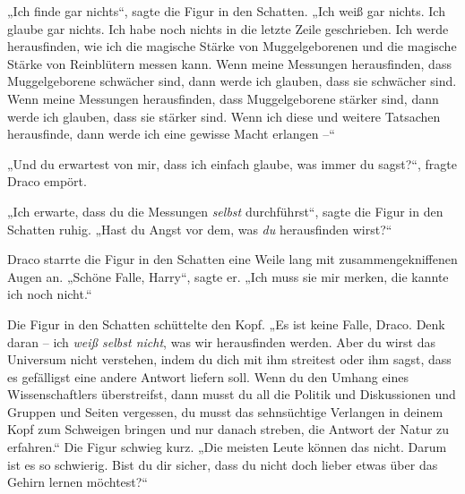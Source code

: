 „Ich finde gar nichts“, sagte die Figur in den Schatten. „Ich weiß gar nichts. Ich glaube gar nichts. Ich habe noch nichts in die letzte Zeile geschrieben. Ich werde herausfinden, wie ich die magische Stärke von Muggelgeborenen und die magische Stärke von Reinblütern messen kann. Wenn meine Messungen herausfinden, dass Muggelgeborene schwächer sind, dann werde ich glauben, dass sie schwächer sind. Wenn meine Messungen herausfinden, dass Muggelgeborene stärker sind, dann werde ich glauben, dass sie stärker sind. Wenn ich diese und weitere Tatsachen herausfinde, dann werde ich eine gewisse Macht erlangen –“

„Und du erwartest von mir, dass ich einfach glaube, was immer du sagst?“, fragte Draco empört.

„Ich erwarte, dass du die Messungen \emph{selbst} durchführst“, sagte die Figur in den Schatten ruhig. „Hast du Angst vor dem, was \emph{du} herausfinden wirst?“

Draco starrte die Figur in den Schatten eine Weile lang mit zusammengekniffenen Augen an. „Schöne Falle, Harry“, sagte er. „Ich muss sie mir merken, die kannte ich noch nicht.“

Die Figur in den Schatten schüttelte den Kopf. „Es ist keine Falle, Draco. Denk daran – ich \emph{weiß selbst nicht}, was wir herausfinden werden. Aber du wirst das Universum nicht verstehen, indem du dich mit ihm streitest oder ihm sagst, dass es gefälligst eine andere Antwort liefern soll. Wenn du den Umhang eines Wissenschaftlers überstreifst, dann musst du all die Politik und Diskussionen und Gruppen und Seiten vergessen, du musst das sehnsüchtige Verlangen in deinem Kopf zum Schweigen bringen und nur danach streben, die Antwort der Natur zu erfahren.“ Die Figur schwieg kurz. „Die meisten Leute können das nicht. Darum ist es so schwierig. Bist du dir sicher, dass du nicht doch lieber etwas über das Gehirn lernen möchtest?“

